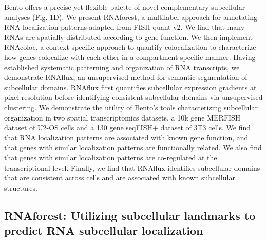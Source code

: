 Bento offers a precise yet flexible palette of novel complementary subcellular analyses (Fig. 1D). We present RNAforest, a multilabel approach for annotating RNA localization patterns adapted from FISH-quant v2\cite{imbertFISHquantV2Scalable}. We find that many RNAs are spatially distributed according to gene function. We then implement RNAcoloc, a context-specific approach to quantify colocalization to characterize how genes colocalize with each other in a compartment-specific manner. Having established systematic patterning and organization of RNA transcripts, we demonstrate RNAflux, an unsupervised method for semantic segmentation of subcellular domains. RNAflux first quantifies subcellular expression gradients at pixel resolution before identifying consistent subcellular domains via unsupervised clustering. We demonstrate the utility of Bento's tools characterizing subcellular organization in two spatial transcriptomics datasets, a 10k gene MERFISH dataset of U2-OS cells and a 130 gene seqFISH+ dataset of 3T3 cells. We find that RNA localization patterns are associated with known gene function, and that genes with similar localization patterns are functionally related. We also find that genes with similar localization patterns are co-regulated at the transcriptional level. Finally, we find that RNAflux identifies subcellular domains that are consistent across cells and are associated with known subcellular structures.



\subsection{RNAforest: Utilizing subcellular landmarks to predict RNA subcellular localization}

